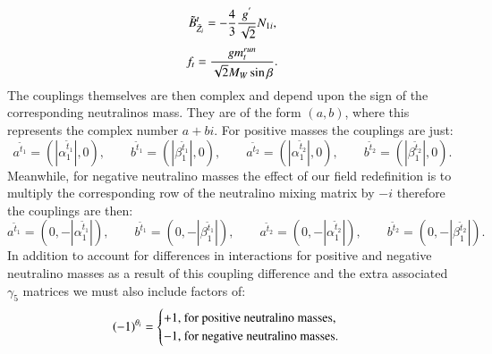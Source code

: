 \documentclass[final,3p,times]{elsarticle}
\begin{document}
\begin{equation}
\tilde{B}^{t}_{\tilde{Z}_i} = -{4 \over 3}{g^{'} \over \sqrt{2}}N_{1i},
\end{equation}
\begin{equation}
f_{t} = {g m_{t}^{run} \over \sqrt{2} M_{W} \sin\beta}.
\end{equation}
The couplings themselves are then complex and depend upon the sign of the corresponding neutralinos mass. They are of the form $(a,b)$, where this represents the complex number $a+bi$.
For positive masses the couplings are just:
\begin{equation}
a^{\tilde{t}_1} = (|\alpha_{1}^{\tilde{t}_1}|,0) , \quad \quad b^{\tilde{t}_1} = (|\beta_{1}^{\tilde{t}_1}|,0), \quad \quad a^{\tilde{t}_2} = (|\alpha_{1}^{\tilde{t}_2}|,0), \quad \quad b^{\tilde{t}_2} = (|\beta_{1}^{\tilde{t}_2}|,0).
\end{equation}
Meanwhile, for negative neutralino masses the effect of our field redefinition is to multiply the corresponding row of the neutralino mixing matrix by $-i$ therefore the couplings are then:
\begin{equation}
a^{\tilde{t}_1} = (0,-|\alpha_{1}^{\tilde{t}_1}|), \quad \quad b^{\tilde{t}_1} = (0,-|\beta_{1}^{\tilde{t}_1}|), \quad \quad a^{\tilde{t}_2} = (0,-|\alpha_{1}^{\tilde{t}_2}|), \quad \quad b^{\tilde{t}_2} = (0,-|\beta_{1}^{\tilde{t}_2}|).
\end{equation}
In addition to account for differences in interactions for positive and negative neutralino masses as a result of this  coupling difference and the extra associated $\gamma_{5}$ matrices we must also include factors of:
\begin{equation}
(-1)^{\theta_i} = \begin{cases}  +1, $ for positive neutralino masses,$ \\
								 -1, $ for negative neutralino masses$. \\
						\end{cases}
\end{equation}
\end{document}
